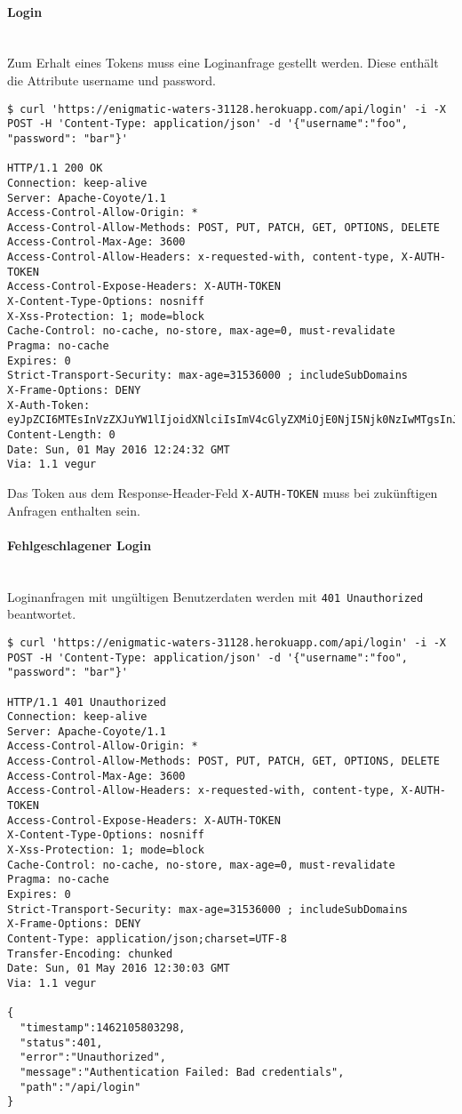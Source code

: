 \paragraph{Login}\mbox{}\\
Zum Erhalt eines Tokens muss eine Loginanfrage gestellt werden. Diese enthält die Attribute username und password.
\vspace{2em}
\begin{lstlisting}
$ curl 'https://enigmatic-waters-31128.herokuapp.com/api/login' -i -X POST -H 'Content-Type: application/json' -d '{"username":"foo", "password": "bar"}'

HTTP/1.1 200 OK
Connection: keep-alive
Server: Apache-Coyote/1.1
Access-Control-Allow-Origin: *
Access-Control-Allow-Methods: POST, PUT, PATCH, GET, OPTIONS, DELETE
Access-Control-Max-Age: 3600
Access-Control-Allow-Headers: x-requested-with, content-type, X-AUTH-TOKEN
Access-Control-Expose-Headers: X-AUTH-TOKEN
X-Content-Type-Options: nosniff
X-Xss-Protection: 1; mode=block
Cache-Control: no-cache, no-store, max-age=0, must-revalidate
Pragma: no-cache
Expires: 0
Strict-Transport-Security: max-age=31536000 ; includeSubDomains
X-Frame-Options: DENY
X-Auth-Token: eyJpZCI6MTEsInVzZXJuYW1lIjoidXNlciIsImV4cGlyZXMiOjE0NjI5Njk0NzIwMTgsInJvbGVzIjpbIlVTRVIiXX0=.LDd74G0yJAuQChYR9P0AOmThfylOGGlY19u2DcTcXyQ=
Content-Length: 0
Date: Sun, 01 May 2016 12:24:32 GMT
Via: 1.1 vegur
\end{lstlisting}
\vspace{2em}
Das Token aus dem Response-Header-Feld \colorbox{pregray}{\lstinline{X-AUTH-TOKEN}} muss bei zukünftigen Anfragen enthalten sein.

\paragraph{Fehlgeschlagener Login}\mbox{}\\
Loginanfragen mit ungültigen Benutzerdaten werden mit \colorbox{pregray}{\lstinline{401 Unauthorized}} beantwortet.
\vspace{2em}
\begin{lstlisting}
$ curl 'https://enigmatic-waters-31128.herokuapp.com/api/login' -i -X POST -H 'Content-Type: application/json' -d '{"username":"foo", "password": "bar"}'

HTTP/1.1 401 Unauthorized
Connection: keep-alive
Server: Apache-Coyote/1.1
Access-Control-Allow-Origin: *
Access-Control-Allow-Methods: POST, PUT, PATCH, GET, OPTIONS, DELETE
Access-Control-Max-Age: 3600
Access-Control-Allow-Headers: x-requested-with, content-type, X-AUTH-TOKEN
Access-Control-Expose-Headers: X-AUTH-TOKEN
X-Content-Type-Options: nosniff
X-Xss-Protection: 1; mode=block
Cache-Control: no-cache, no-store, max-age=0, must-revalidate
Pragma: no-cache
Expires: 0
Strict-Transport-Security: max-age=31536000 ; includeSubDomains
X-Frame-Options: DENY
Content-Type: application/json;charset=UTF-8
Transfer-Encoding: chunked
Date: Sun, 01 May 2016 12:30:03 GMT
Via: 1.1 vegur

{
  "timestamp":1462105803298,
  "status":401,
  "error":"Unauthorized",
  "message":"Authentication Failed: Bad credentials",
  "path":"/api/login"
}
\end{lstlisting}

